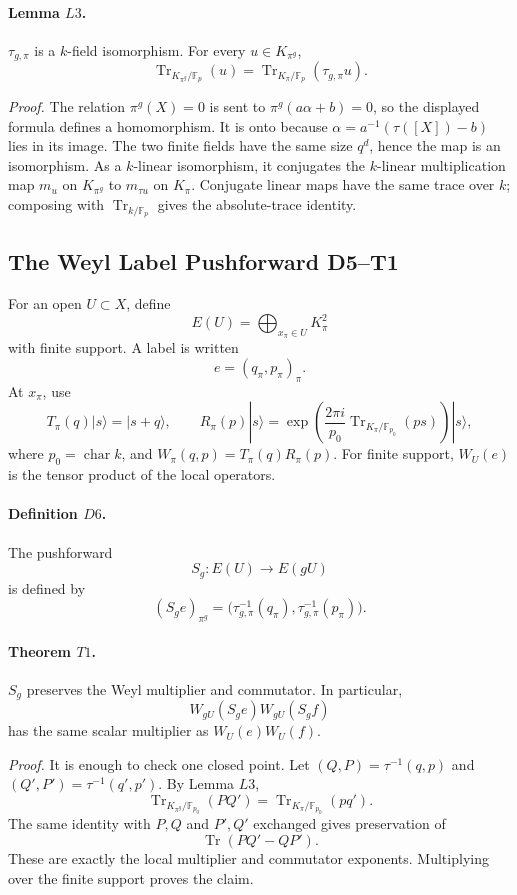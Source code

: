 \paragraph{Lemma \(L3\).}
\(\tau_{g,\pi}\) is a \(k\)-field isomorphism.  For every
\(u\in K_{\pi^g}\),
\[
  \operatorname{Tr}_{K_{\pi^g}/\mathbb F_p}(u)
  =
  \operatorname{Tr}_{K_\pi/\mathbb F_p}(\tau_{g,\pi}u).
\]

\emph{Proof.}
The relation \(\pi^g(X)=0\) is sent to
\(\pi^g(a\alpha+b)=0\), so the displayed formula defines a homomorphism.
It is onto because \(\alpha=a^{-1}(\tau([X])-b)\) lies in its image.  The two
finite fields have the same size \(q^d\), hence the map is an isomorphism.
As a \(k\)-linear isomorphism, it conjugates the \(k\)-linear multiplication
map \(m_u\) on \(K_{\pi^g}\) to \(m_{\tau u}\) on \(K_\pi\).  Conjugate
linear maps have the same trace over \(k\); composing with
\(\operatorname{Tr}_{k/\mathbb F_p}\) gives the absolute-trace identity.

\subsection{The Weyl Label Pushforward D5--T1}

For an open \(U\subset X\), define
\[
  E(U)=\bigoplus_{x_\pi\in U}K_\pi^2
\]
with finite support.  A label is written
\[
  e=(q_\pi,p_\pi)_\pi .
\]
At \(x_\pi\), use
\[
  T_\pi(q)|s\rangle=|s+q\rangle,\qquad
  R_\pi(p)|s\rangle=
  \exp\!\left(\frac{2\pi i}{p_0}
  \operatorname{Tr}_{K_\pi/\mathbb F_{p_0}}(ps)\right)|s\rangle,
\]
where \(p_0=\operatorname{char}k\), and \(W_\pi(q,p)=T_\pi(q)R_\pi(p)\).
For finite support, \(W_U(e)\) is the tensor product of the local operators.

\paragraph{Definition \(D6\).}
The pushforward
\[
  S_g:E(U)\longrightarrow E(gU)
\]
is defined by
\[
  (S_g e)_{\pi^g}
  =
  \bigl(\tau_{g,\pi}^{-1}(q_\pi),
        \tau_{g,\pi}^{-1}(p_\pi)\bigr).
\]

\paragraph{Theorem \(T1\).}
\(S_g\) preserves the Weyl multiplier and commutator.  In particular,
\[
  W_{gU}(S_ge)W_{gU}(S_gf)
\]
has the same scalar multiplier as \(W_U(e)W_U(f)\).

\emph{Proof.}
It is enough to check one closed point.  Let
\((Q,P)=\tau^{-1}(q,p)\) and \((Q',P')=\tau^{-1}(q',p')\).  By Lemma \(L3\),
\[
  \operatorname{Tr}_{K_{\pi^g}/\mathbb F_{p_0}}(PQ')
  =
  \operatorname{Tr}_{K_\pi/\mathbb F_{p_0}}(pq').
\]
The same identity with \(P,Q\) and \(P',Q'\) exchanged gives preservation of
\[
  \operatorname{Tr}(PQ'-QP').
\]
These are exactly the local multiplier and commutator exponents.  Multiplying
over the finite support proves the claim.

